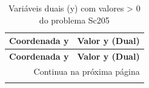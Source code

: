 \documentclass[12pt]{article}
\begin{document}
\begin{longtable}{@{}cc@{}}
\caption{Variáveis duais (y) com valores > 0 do problema Sc205} \\
\toprule
\textbf{Coordenada y} & \textbf{Valor y (Dual)} \\
\midrule
\endfirsthead

\toprule
\textbf{Coordenada y} & \textbf{Valor y (Dual)} \\
\midrule
\endhead

\midrule \multicolumn{2}{r}{{Continua na próxima página}} \\ \midrule
\endfoot

\bottomrule
\endlastfoot

\bottomrule
\end{longtable}
\end{document}
